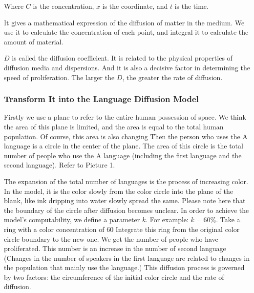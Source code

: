 \documentclass{mcmthesis}
\begin{document}
    Where $C$ is the concentration, $x$ is the coordinate, and $t$ is the time.

    It gives a mathematical expression of the diffusion of matter in the medium.
    We use it to calculate the concentration of each point,
    and integral it to calculate the amount of material.

    $D$ is called the diffusion coefficient.
    It is related to the physical properties of diffusion media and dispersions.
    And it is also a decisive factor in determining the speed of proliferation.
    The larger the $D$, the greater the rate of diffusion.
    \subsubsection{Transform It into the Language Diffusion Model}%

    Firstly we use a plane to refer to the entire human possession of space.
    We think the area of this plane is limited, and the area is equal to the total human population.
    Of course, this area is also changing
    Then the person who uses the A language is a circle in the center of the plane.
    The area of this circle is the total number of people who use the A language (including the first language and the second language).
    Refer to Picture 1.

    The expansion of the total number of languages is the process of increasing color.
    In the model, it is the color slowly from the color circle into the plane of the blank, like ink dripping into water slowly spread the same.
    Please note here that the boundary of the circle after diffusion becomes unclear.
    In order to achieve the model's computability, we define a parameter $k$.
    For example: $k=60\%$.
    Take a ring with a color concentration of 60%
    Integrate this ring from the original color circle boundary to the new one.
    We get the number of people who have proliferated.
    This number is an increase in the number of second language
    (Changes in the number of speakers in the first language are related to changes in the population that mainly use the language.)
    This diffusion process is governed by two factors: the circumference of the initial color circle and the rate of diffusion.
\end{document}
